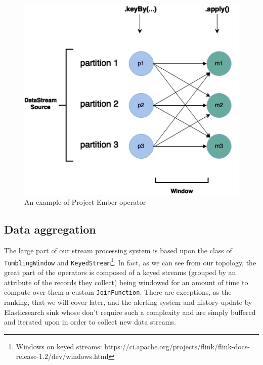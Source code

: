 \begin{figure}[!b]
\begin{center}
	\includegraphics[scale=0.40]{img/ember_keyedstream}
	\caption{An example of Project Ember operator}
	\label{fig:ember_operator}
\end{center}
\end{figure}

\subsection{Data aggregation}
The large part of our stream processing system is based upon the class of \texttt{TumblingWindow} and \texttt{KeyedStream}\footnote{Windows on keyed streams: https://ci.apache.org/projects/flink/flink-docs-release-1.2/dev/windows.html}. In fact, as we can see from our topology, the great part of the operators is composed of a keyed streams (grouped by an attribute of the records they collect) being windowed for an amount of time to compute over them a custom \texttt{JoinFunction}. There are exceptions, as the ranking, that we will cover later, and the alerting system and history-update by Elasticsearch sink whose don't require such a complexity and are simply buffered and iterated upon in order to collect new data streams. 

